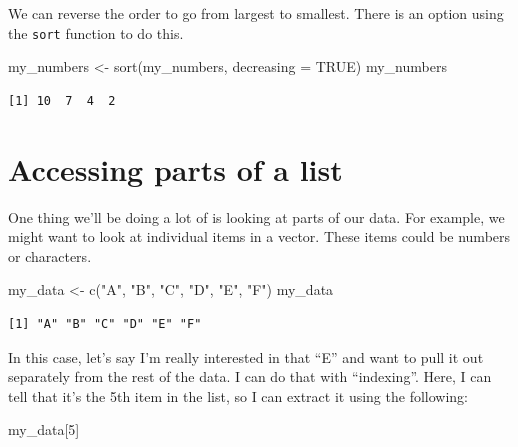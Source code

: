 \documentclass[
  letterpaper,
  DIV=11,
  numbers=noendperiod]{scrreprt}
\newenvironment{Shaded}{\begin{snugshade}}{\end{snugshade}}
\newcommand{\AttributeTok}[1]{\textcolor[rgb]{0.40,0.45,0.13}{#1}}
\newcommand{\ConstantTok}[1]{\textcolor[rgb]{0.56,0.35,0.01}{#1}}
\newcommand{\DecValTok}[1]{\textcolor[rgb]{0.68,0.00,0.00}{#1}}
\newcommand{\FunctionTok}[1]{\textcolor[rgb]{0.28,0.35,0.67}{#1}}
\newcommand{\NormalTok}[1]{\textcolor[rgb]{0.00,0.23,0.31}{#1}}
\newcommand{\OtherTok}[1]{\textcolor[rgb]{0.00,0.23,0.31}{#1}}
\newcommand{\StringTok}[1]{\textcolor[rgb]{0.13,0.47,0.30}{#1}}
\begin{document}
We can reverse the order to go from largest to smallest. There is an
option using the \texttt{sort} function to do this.

\begin{Shaded}
\begin{Highlighting}[]
\NormalTok{my\_numbers }\OtherTok{\textless{}{-}} \FunctionTok{sort}\NormalTok{(my\_numbers, }\AttributeTok{decreasing =} \ConstantTok{TRUE}\NormalTok{)}
\NormalTok{my\_numbers}
\end{Highlighting}
\end{Shaded}

\begin{verbatim}
[1] 10  7  4  2
\end{verbatim}

\hypertarget{accessing-parts-of-a-list}{%
\section{Accessing parts of a list}\label{accessing-parts-of-a-list}}

One thing we'll be doing a lot of is looking at parts of our data. For
example, we might want to look at individual items in a vector. These
items could be numbers or characters.

\begin{Shaded}
\begin{Highlighting}[]
\NormalTok{my\_data }\OtherTok{\textless{}{-}} \FunctionTok{c}\NormalTok{(}\StringTok{"A"}\NormalTok{, }\StringTok{"B"}\NormalTok{, }\StringTok{"C"}\NormalTok{, }\StringTok{"D"}\NormalTok{, }\StringTok{"E"}\NormalTok{, }\StringTok{"F"}\NormalTok{)}
\NormalTok{my\_data}
\end{Highlighting}
\end{Shaded}

\begin{verbatim}
[1] "A" "B" "C" "D" "E" "F"
\end{verbatim}

In this case, let's say I'm really interested in that ``E'' and want to
pull it out separately from the rest of the data. I can do that with
``indexing''. Here, I can tell that it's the 5th item in the list, so I
can extract it using the following:

\begin{Shaded}
\begin{Highlighting}[]
\NormalTok{my\_data[}\DecValTok{5}\NormalTok{]}
\end{Highlighting}
\end{Shaded}
\end{document}
